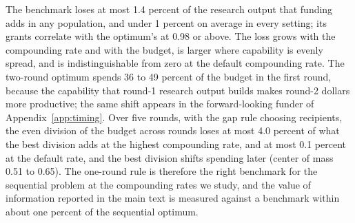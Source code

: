 The benchmark loses at most 1.4 percent of the research output that funding adds in any population, and under 1 percent on average in every setting; its grants correlate with the optimum's at 0.98 or above. The loss grows with the compounding rate and with the budget, is larger where capability is evenly spread, and is indistinguishable from zero at the default compounding rate. The two-round optimum spends 36 to 49 percent of the budget in the first round, because the capability that round-1 research output builds makes round-2 dollars more productive; the same shift appears in the forward-looking funder of Appendix~\ref{app:timing}. Over five rounds, with the gap rule choosing recipients, the even division of the budget across rounds loses at most 4.0 percent of what the best division adds at the highest compounding rate, and at most 0.1 percent at the default rate, and the best division shifts spending later (center of mass 0.51 to 0.65). The one-round rule is therefore the right benchmark for the sequential problem at the compounding rates we study, and the value of information reported in the main text is measured against a benchmark within about one percent of the sequential optimum.
